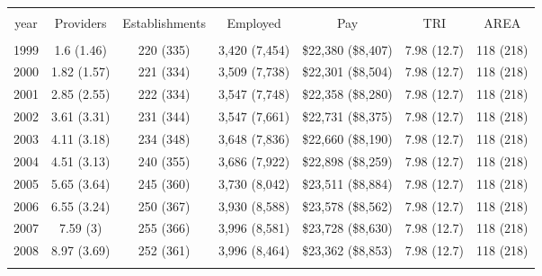 
\begin{table}[!htbp] \centering 
  \caption{} 
  \label{} 
\begin{tabular}{@{\extracolsep{5pt}} ccccccc} 
\\[-1.8ex]\hline 
\hline \\[-1.8ex] 
year & Providers & Establishments & Employed & Pay & TRI & AREA \\ 
\hline \\[-1.8ex] 
1999 & 1.6 (1.46) & 220 (335) & 3,420 (7,454) & \$22,380 (\$8,407) & 7.98 (12.7) & 118 (218) \\ 
2000 & 1.82 (1.57) & 221 (334) & 3,509 (7,738) & \$22,301 (\$8,504) & 7.98 (12.7) & 118 (218) \\ 
2001 & 2.85 (2.55) & 222 (334) & 3,547 (7,748) & \$22,358 (\$8,280) & 7.98 (12.7) & 118 (218) \\ 
2002 & 3.61 (3.31) & 231 (344) & 3,547 (7,661) & \$22,731 (\$8,375) & 7.98 (12.7) & 118 (218) \\ 
2003 & 4.11 (3.18) & 234 (348) & 3,648 (7,836) & \$22,660 (\$8,190) & 7.98 (12.7) & 118 (218) \\ 
2004 & 4.51 (3.13) & 240 (355) & 3,686 (7,922) & \$22,898 (\$8,259) & 7.98 (12.7) & 118 (218) \\ 
2005 & 5.65 (3.64) & 245 (360) & 3,730 (8,042) & \$23,511 (\$8,884) & 7.98 (12.7) & 118 (218) \\ 
2006 & 6.55 (3.24) & 250 (367) & 3,930 (8,588) & \$23,578 (\$8,562) & 7.98 (12.7) & 118 (218) \\ 
2007 & 7.59 (3) & 255 (366) & 3,996 (8,581) & \$23,728 (\$8,630) & 7.98 (12.7) & 118 (218) \\ 
2008 & 8.97 (3.69) & 252 (361) & 3,996 (8,464) & \$23,362 (\$8,853) & 7.98 (12.7) & 118 (218) \\ 
\hline \\[-1.8ex] 
\end{tabular} 
\end{table} 

